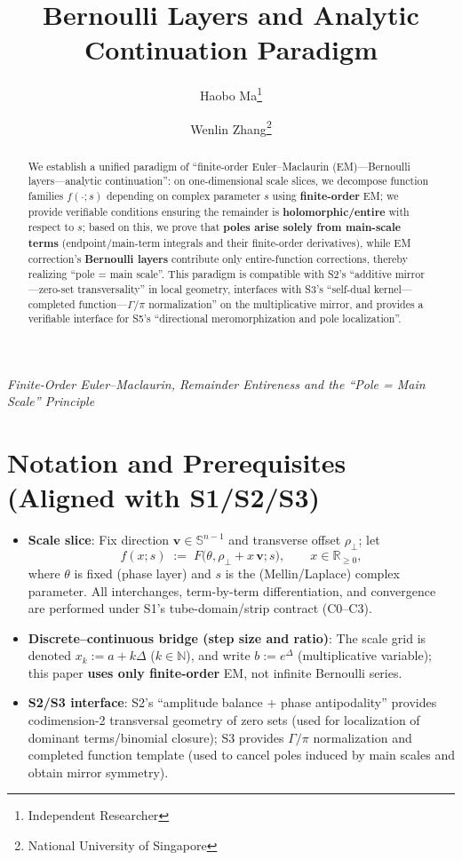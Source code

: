\documentclass[11pt,a4paper]{article}
\title{Bernoulli Layers and Analytic Continuation Paradigm}
\author{Haobo Ma\thanks{Independent Researcher} \and Wenlin Zhang\thanks{National University of Singapore}}
\date{}
\theoremstyle{remark}
\begin{document}
\maketitle

\begin{center}
\textit{Finite-Order Euler--Maclaurin, Remainder Entireness and the ``Pole = Main Scale'' Principle}
\end{center}

\begin{abstract}
We establish a unified paradigm of ``finite-order Euler--Maclaurin (EM)---Bernoulli layers---analytic continuation'': on one-dimensional scale slices, we decompose function families $f(\cdot;s)$ depending on complex parameter $s$ using \textbf{finite-order} EM; we provide verifiable conditions ensuring the remainder is \textbf{holomorphic/entire} with respect to $s$; based on this, we prove that \textbf{poles arise solely from main-scale terms} (endpoint/main-term integrals and their finite-order derivatives), while EM correction's \textbf{Bernoulli layers} contribute only entire-function corrections, thereby realizing ``pole = main scale''. This paradigm is compatible with S2's ``additive mirror---zero-set transversality'' in local geometry, interfaces with S3's ``self-dual kernel---completed function---$\Gamma/\pi$ normalization'' on the multiplicative mirror, and provides a verifiable interface for S5's ``directional meromorphization and pole localization''.
\end{abstract}

\section{Notation and Prerequisites (Aligned with S1/S2/S3)}

\begin{itemize}
\item \textbf{Scale slice}: Fix direction $\mathbf{v}\in\mathbb{S}^{n-1}$ and transverse offset $\rho_\perp$; let
\begin{equation}
f(x;s)\;:=\;F\bigl(\theta,\rho_\perp+x\,\mathbf{v}; s\bigr),\qquad x\in\mathbb{R}_{\ge0},
\end{equation}
where $\theta$ is fixed (phase layer) and $s$ is the (Mellin/Laplace) complex parameter. All interchanges, term-by-term differentiation, and convergence are performed under S1's tube-domain/strip contract (C0--C3).

\item \textbf{Discrete--continuous bridge (step size and ratio)}: The scale grid is denoted $x_k:=a+k\Delta$ ($k\in\mathbb{N}$), and write $b:=e^{\Delta}$ (multiplicative variable); this paper \textbf{uses only finite-order} EM, not infinite Bernoulli series.

\item \textbf{S2/S3 interface}: S2's ``amplitude balance + phase antipodality'' provides codimension-2 transversal geometry of zero sets (used for localization of dominant terms/binomial closure); S3 provides $\Gamma/\pi$ normalization and completed function template (used to cancel poles induced by main scales and obtain mirror symmetry).
\end{itemize}
\end{document}
